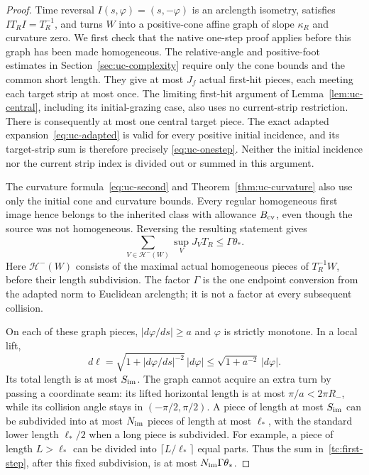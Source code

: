 \begin{proof}
Time reversal $I(s,\varphi)=(s,-\varphi)$ is an arclength isometry,
satisfies $IT_RI=T_R^{-1}$, and turns $W$ into a positive-cone
affine graph of slope $\kappa_R$ and curvature zero.  We first check
that the native one-step proof applies before this graph has been
made homogeneous.  The relative-angle and positive-foot estimates
in Section~\ref{sec:uc-complexity} require only the cone bounds and
the common short length.  They give at most $J_f$ actual first-hit
pieces, each meeting each target strip at most once.  The limiting
first-hit argument of Lemma~\ref{lem:uc-central}, including its
initial-grazing case, also uses no current-strip restriction.  There
is consequently at most one central target piece.  The exact
adapted expansion~\eqref{eq:uc-adapted} is valid for every positive
initial incidence, and its target-strip sum is therefore precisely
\eqref{eq:uc-onestep}.  Neither the initial incidence nor the current
strip index is divided out or summed in this argument.

The curvature formula~\eqref{eq:uc-second} and
Theorem~\ref{thm:uc-curvature} also use only the initial cone and
curvature bounds.  Every regular homogeneous first image hence
belongs to the inherited class with allowance $B_{\rm cv}$, even
though the source was not homogeneous.  Reversing the resulting
statement gives
\begin{equation}\label{tc:first-step}
 \sum_{V\in\mathcal H^-(W)}\sup_V J_VT_R
                         \le\Gamma\theta_*.
\end{equation}
Here $\mathcal H^-(W)$ consists of the maximal actual homogeneous
pieces of $T_R^{-1}W$, before their length subdivision.  The factor
$\Gamma$ is the one endpoint conversion from the adapted norm to
Euclidean arclength; it is not a factor at every subsequent collision.

On each of these graph pieces, $|d\varphi/ds|\ge a$ and
$\varphi$ is strictly monotone.  In a local lift,
\[
 d\ell=\sqrt{1+|d\varphi/ds|^{-2}}\,|d\varphi|
                    \le\sqrt{1+a^{-2}}\,|d\varphi|.
\]
Its total length is at most $S_{\rm im}$.  The graph cannot acquire
an extra turn by passing a coordinate seam: its lifted horizontal
length is at most $\pi/a<2\pi R_-$, while its collision angle stays
in $(-\pi/2,\pi/2)$.  A piece of length at most $S_{\rm im}$ can
be subdivided into at most $N_{\rm im}$ pieces of length at most
$\ell_*$, with the standard lower length $\ell_*/2$ when a long
piece is subdivided.  For example, a piece of length $L>\ell_*$
can be divided into $\lceil L/\ell_*\rceil$ equal parts.  Thus
the sum in~\eqref{tc:first-step}, after this fixed subdivision, is
at most $N_{\rm im}\Gamma\theta_*$.


\end{proof}
